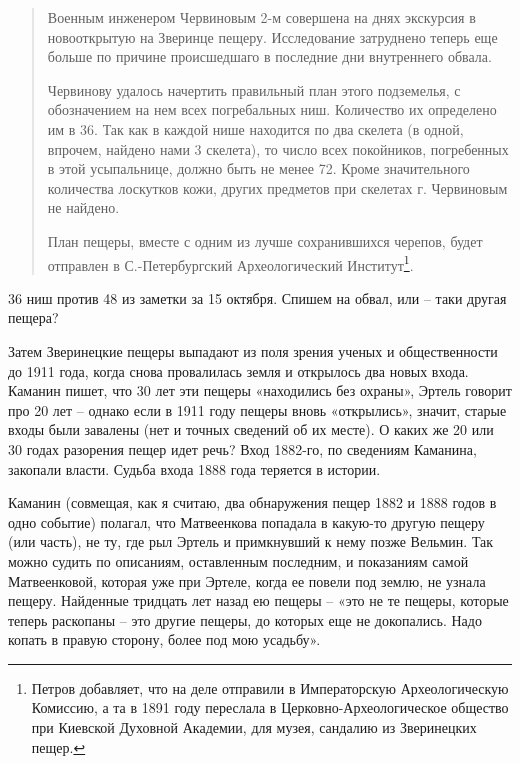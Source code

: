\begin{quotation}
Военным инженером Червиновым 2-м совершена на днях экскурсия в новооткрытую на Зверинце пещеру. Исследование затруднено теперь еще больше по причине происшедшаго в последние дни внутреннего обвала.

Червинову удалось начертить правильный план этого подземелья, с обозначением на нем всех погребальных ниш. Количество их определено им в 36. Так как в каждой нише находится по два скелета (в одной, впрочем, найдено нами 3 скелета), то число всех покойников, погребенных в этой усыпальнице, должно быть не менее 72. Кроме значительного количества лоскутков кожи, других предметов при скелетах г. Червиновым не найдено.

План пещеры, вместе с одним из лучше сохранившихся черепов, будет отправлен в С.-Пе\-тербургский Археологический Институт\footnote{Петров добавляет, что на деле отправили в Императорскую Археологическую Комиссию, а та в 1891 году переслала в Церковно-Археологическое общество при Киевской Духовной Академии, для музея, сандалию из Зверинецких пещер.}.
\end{quotation}

36 ниш против 48 из заметки за 15 октября. Спишем на обвал, или – таки другая пещера?

Затем Зверинецкие пещеры выпадают из поля зрения ученых и общественности до 1911 года,  когда снова провалилась земля и открылось два новых входа. Каманин пишет, что 30 лет эти пещеры «находились без охраны», Эртель говорит про 20 лет – однако если в 1911 году пещеры вновь «открылись», значит, старые входы были завалены (нет и точных сведений об их месте). О каких же 20 или 30 годах разорения пещер идет речь? Вход 1882-го, по сведениям Каманина, закопали власти. Судьба входа 1888 года теряется в истории.


Каманин (совмещая, как я считаю, два обнаружения пещер 1882 и 1888 годов в одно событие) полагал, что Матвеенкова попадала в какую-то другую пещеру (или часть), не ту, где рыл Эртель и примкнувший к нему позже Вельмин. Так можно судить по описаниям, оставленным последним, и показаниям самой Матвеенковой, которая уже при Эртеле, когда ее повели под землю, не узнала пещеру. Найденные тридцать лет назад ею пещеры – «это не те пещеры, которые теперь раскопаны – это другие пещеры, до которых еще не докопались. Надо копать в правую сторону, более под мою усадьбу».

